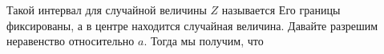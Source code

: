 \documentclass[12pt, a4paper, oneside]{article}
\begin{document}
\begin{sol}
Такой интервал для случайной величины $Z$ называется  Его границы фиксированы, а в центре находится случайная величина. Давайте разрешим неравенство относительно $a$. Тогда мы получим, что













\end{sol}
\end{document}
